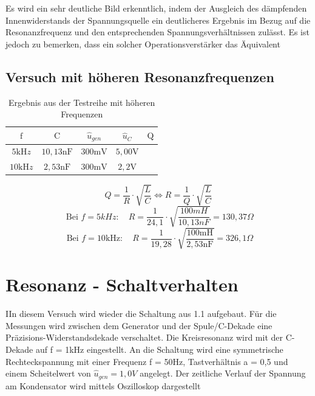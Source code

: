 \documentclass{article}
\begin{document}
Es wird ein sehr deutliche Bild erkenntlich, indem der Ausgleich des dämpfenden Innenwiderstands der
Spannungsquelle ein deutlicheres Ergebnis im Bezug auf die Resonanzfrequenz und den entsprechenden Spannungsverhältnissen zulässt.
Es ist jedoch zu bemerken, dass ein solcher Operationsverstärker das Äquivalent


\subsection{Versuch mit höheren Resonanzfrequenzen}

\begin{table}[h]

  \begin{center}

    \begin{tabular}{|c|c|c|c|c|}
      \hline $\mathrm{f}$       & $\mathrm{C}$        & $\hat{u}_{g e n}$ & $\hat{u}_C$       & $\mathrm{Q}$ \\
      \hline $5 \mathrm{kH} z$  & $10,13 \mathrm{nF}$ & $300 \mathrm{mV}$ & $5,00 \mathrm{V}$ &              \\
      \hline $10 \mathrm{kH} z$ & $2,53 \mathrm{nF}$  & $300 \mathrm{mV}$ & $2,2 \mathrm{V}$  &              \\
      \hline
    \end{tabular}
    \caption{Ergebnis aus der Testreihe mit höheren Frequenzen}
    \label{tab:lCUQ}
  \end{center}
\end{table}
$$Q=\frac{1}{R} \cdot \sqrt{\frac{L}{C}} \Leftrightarrow R=\frac{1}{Q} \cdot \sqrt{\frac{L}{C}}$$
\begin{equation*}
  \text { Bei } f=5 k H z: \quad R=\frac{1}{24,1} \cdot \sqrt{\frac{100 m H}{10,13 n F}}=130,37 \Omega
\end{equation*}
\begin{equation*}
  \text { Bei } f=10 \mathrm{kHz}: \quad R=\frac{1}{19,28} \cdot \sqrt{\frac{100 \mathrm{mH}}{2,53 \mathrm{nF}}}=326,1 \Omega
\end{equation*}

\newpage
\section{Resonanz - Schaltverhalten}
\begin{task}
  IIn diesem Versuch wird wieder die Schaltung aus 1.1 aufgebaut. Für die Messungen wird zwischen dem Generator und der Spule/C-Dekade eine Präzisions-Widerstandsdekade verschaltet.
  Die Kreisresonanz wird mit der C-Dekade auf f = 1kHz eingestellt. An die Schaltung wird eine symmetrische Rechteckspannung mit einer Frequenz f = 50Hz, Tastverhältnis a = 0,5 und einem Scheitelwert von $\hat{u}_{gen} = 1,0 V$ angelegt.
  Der zeitliche Verlauf der Spannung am Kondensator wird mittels Oszilloskop dargestellt
\end{task}
\end{document}
